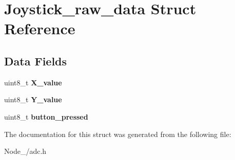 \hypertarget{structJoystick__raw__data}{}\section{Joystick\+\_\+raw\+\_\+data Struct Reference}
\label{structJoystick__raw__data}
\subsection*{Data Fields}
\begin{DoxyCompactItemize}
\item 
uint8\+\_\+t {\bfseries X\+\_\+value}\hypertarget{structJoystick__raw__data_aef4cba54d5cbb6f3f9e32e96216d4795}{}\label{structJoystick__raw__data_aef4cba54d5cbb6f3f9e32e96216d4795}

\item 
uint8\+\_\+t {\bfseries Y\+\_\+value}\hypertarget{structJoystick__raw__data_a57086c5639864f608747bec4898520c5}{}\label{structJoystick__raw__data_a57086c5639864f608747bec4898520c5}

\item 
uint8\+\_\+t {\bfseries button\+\_\+pressed}\hypertarget{structJoystick__raw__data_a1a1897431af6ada6f8c212b817691179}{}\label{structJoystick__raw__data_a1a1897431af6ada6f8c212b817691179}

\end{DoxyCompactItemize}


The documentation for this struct was generated from the following file\+:\begin{DoxyCompactItemize}
\item 
Node\+\_/adc.\+h\end{DoxyCompactItemize}
